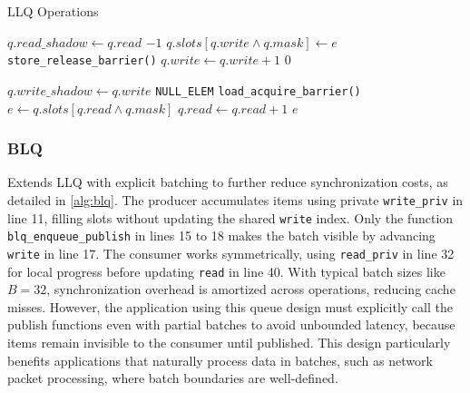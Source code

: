 \begin{algorithm}[!ht]
   \centering
   \captionsetup{justification=centering}
   \caption{\ac{LLQ} Operations \cite{MaffioneCacheAware}}
   \label{alg:llq}
   \scriptsize
   \begin{algorithmic}[1]
            
               \State $q.read\_shadow \gets q.read$ 
                   \State \Return $-1$ 
               \EndIf
           \EndIf
           \State $q.slots[q.write \land q.mask] \gets e$
           \State \texttt{store\_release\_barrier()}
           \State $q.write \gets q.write + 1$
           \State \Return $0$
       \EndFunction
       
       \State
       
            
               \State $q.write\_shadow \gets q.write$ 
                   \State \Return \texttt{NULL\_ELEM}
               \EndIf
           \EndIf
           \State \texttt{load\_acquire\_barrier()}
           \State $e \gets q.slots[q.read \land q.mask]$
           \State $q.read \gets q.read + 1$
           \State \Return $e$
       \EndFunction
   \end{algorithmic}
\end{algorithm}

\subsubsection{\acf{BLQ}}
Extends \ac{LLQ} with explicit batching to further reduce synchronization costs, as detailed in \cref{alg:blq}. The producer accumulates items using private \texttt{write\_priv} in line 11, filling slots without updating the shared \texttt{write} index. Only the function \texttt{blq\_enqueue\_publish} in lines 15 to 18 makes the batch visible by advancing \texttt{write} in line 17. The consumer works symmetrically, using \texttt{read\_priv} in line 32 for local progress before updating \texttt{read} in line 40. With typical batch sizes like $B = 32$, synchronization overhead is amortized across operations, reducing cache misses. However, the application using this queue design must explicitly call the publish functions even with partial batches to avoid unbounded latency, because items remain invisible to the consumer until published. This design particularly benefits applications that naturally process data in batches, such as network packet processing, where batch boundaries are well-defined. \cite{MaffioneCacheAware}

